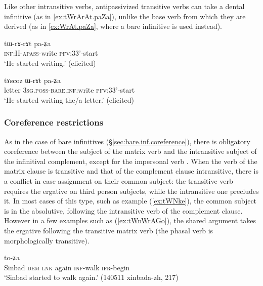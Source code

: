 Like other intransitive verbs, antipassivized transitive verbs can take a dental infinitive (as in \ref{ex:tWrArAt.paZa}), unlike the base verb from which they are derived (as in \ref{ex:WrAt.paZa}, where a bare infinitive is used instead).

\begin{exe}
\ex \label{ex:tWrArAt.paZa}
\gll tɯ-rɤ-rɤt pa-ʑa \\
\textsc{inf}:II-\textsc{apass}-write \textsc{pfv}:3\fl{}3'-start \\
\glt `He started writing.' (elicited)
\end{exe}

\begin{exe}
\ex \label{ex:WrAt.paZa}
\gll tɤscoz ɯ-rɤt pa-ʑa \\
letter \textsc{3sg}.\textsc{poss}-\textsc{bare.inf:}write \textsc{pfv}:3\fl{}3'-start \\
\glt `He started writing the/a letter.' (elicited)
\end{exe}

\subsubsection{Coreference restrictions} \label{sec:dental.inf.coreference}
As in the case of bare infinitives (§\ref{sec:bare.inf.coreference}), there is obligatory coreference between the subject of the matrix verb and the intransitive subject of the  infinitival complement, except for the  impersonal verb . When the verb of the matrix clause is transitive and that of the complement clause intransitive, there is a conflict in case assignment on their common subject: the transitive verb requires the ergative on third person subjects, while the intransitive one precludes it. In most cases of this type, such as example (\ref{ex:tWNke}), the common subject is in the absolutive, following the intransitive verb of the complement clause. However in a few examples such as (\ref{ex:tWnWrAGo}), the shared argument takes the ergative following the transitive matrix verb (the phasal verb  is morphologically transitive).  

\begin{exe}
\ex \label{ex:tWNke}
 to-ʑa \\
Sinbad \textsc{dem} \textsc{lnk} again  \textsc{inf}-walk \textsc{ifr}-begin \\
\glt `Sinbad started to walk again.' (140511 xinbada-zh, 217)
\end{exe}

